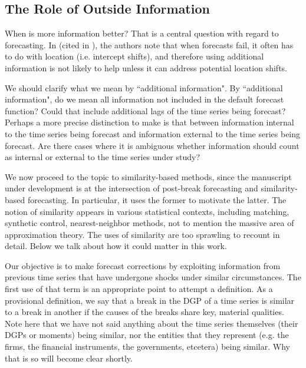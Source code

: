 \documentclass[11pt]{article}
\theoremstyle{definition}
\begin{document}
\subsection{The Role of Outside Information}\label{outside_info}

When is more information better?  That is a central question with regard to forecasting.   In \cite{clements2005guest} (cited in \cite{castle2013forecasting}), the authors note that when forecasts fail, it often has to do with location (i.e. intercept shifts), and therefore using additional information is not likely to help unless it can address potential location shifts.  

We should clarify what we mean by ``additional information".  By ``additional information", do we mean all information not included in the default forecast function?  Could that include additional lags of the time series being forecast?  Perhaps a more precise distinction to make is that between information internal to the time series being forecast and information external to the time series being forecast.  Are there cases where it is ambiguous whether information should count as internal or external to the time series under study?

We now proceed to the topic to similarity-based methods, since the manuscript under development is at the intersection of post-break forecasting and similarity-based forecasting.  In particular, it uses the former to motivate the latter.  The notion of similarity appears in various statistical contexts, including matching, synthetic control, nearest-neighbor methods, not to mention the massive area of approximation theory.  The uses of similarity are too sprawling to recount in detail.  Below we talk about how it could matter in this work.

Our objective is to make forecast corrections by exploiting information from previous time series that have undergone shocks under similar circumstances.  The first use of that term is an appropriate point to attempt a definition.  As a provisional definition, we say that a break in the DGP of a time series is similar to a break in another if the causes of the breaks share key, material qualities.  Note here that we have not said anything about the time series themselves (their DGPs or moments) being similar, nor the entities that they represent (e.g. the firms, the financial instruments, the governments, etcetera) being similar.  Why that is so will become clear shortly.
\end{document}
